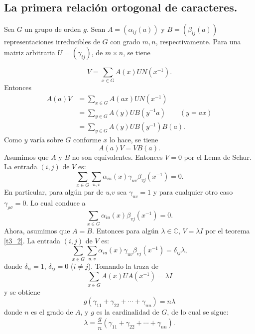\documentclass[12pt]{book}
\theoremstyle{definition}
\newcounter{in}
\begin{document}
\subsection{La primera relación ortogonal de caracteres.}
\label{subsec:roc1}
Sea $G$ un grupo de orden $g$. Sean $A=(\alpha_{ij}(a))$ y
$B=(\beta_{ij}(a))$ representaciones irreducibles de $G$ con grado
$m,n$, respectivamente. Para una matriz arbitraria $U=(\gamma_{ij})$,
de $m \times n$, se tiene

\begin{equation}
  \label{eq:22}
  V=\sum_{x \in G} A(x)UN(x^{-1}).  
\end{equation}
Entonces
\begin{equation}
  \label{eq:23}
  \begin{aligned}
    A(a)V &=\sum_{x \in G} A(ax)UN(x^{-1})\\
    &=\sum_{y \in G} A(y)UB(y^{-1}a) \qquad (y=ax)\\
    &=\sum_{y \in G} A(y)UB(y^{-1})B(a).
  \end{aligned}
\end{equation}
Como $y$ varía sobre $G$ conforme $x$ lo hace, se tiene
\begin{equation}
  \label{eq:24}
  A(a)V=VB(a).
\end{equation} 
Asumimos que $A$ y $B$ no son equivalentes. Entonces $V=0$ por el Lema
de Schur. La entrada $(i,j)$ de $V$ es:
\begin{equation}
  \label{eq:25}
  \sum_{x \in G} \sum_{u,v} \alpha_{iu}(x) \gamma_{uv} \beta_{vj}(x^{-1}) = 0.
\end{equation}
En particular, para algún par de $u$,$v$ sea $\gamma_{uv}=1$ y para
cualquier otro caso~$\gamma_{\rho \sigma}=0$. Lo cual conduce a
\begin{equation}
  \label{eq:26}
  \sum_{x \in G} \alpha_{iu}(x) \beta_{vj}(x^{-1}) = 0.
\end{equation}
Ahora, asumimos que $A=B$. Entonces para algún
$\lambda \in \mathbb{C}$, $V=\lambda I$ por el teorema \ref{t3_2}. La
entrada $(i,j)$ de $V$ es:
\begin{equation}
  \label{eq:27}
   \sum_{x \in G} \sum_{u,v} \alpha_{iu}(x) \gamma_{uv} \beta_{vj}(x^{-1}) = \delta_{ij}\lambda,
\end{equation}
donde $\delta_{ii}=1$, $\delta_{ij}=0$ ($i \neq j$). Tomando la traza de
\begin{equation}
  \label{eq:28}
  \sum_{x \in G} A(x)UA(x^{-1}) = \lambda I
\end{equation}
y se obtiene
\begin{equation}
  \label{eq:29}
  g(\gamma_{11}+\gamma_{22}+ \cdots +\gamma_{nn})=n \lambda
\end{equation}
donde $n$ es el grado de $A$, y $g$ es la cardinalidad de $G$, de lo cual se sigue:
\begin{equation}
  \label{eq:30}
  \lambda=\frac{g}{n}(\gamma_{11}+\gamma_{22}+ \cdots + \gamma_{nn}).
\end{equation}
\end{document}
